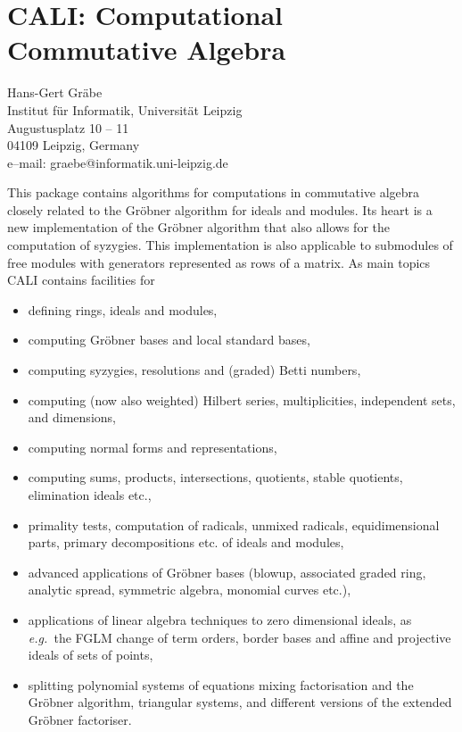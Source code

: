\documentclass[11pt,letterpaper]{book}
\makeatletter
\newcommand{\underscore}{\_}
\newcommand{\ttindex}[1]{{\renewcommand{\_}{\protect\underscore}%
                          \index{#1@{\tt #1}}}}
\makeatother
\begin{document}
\chapter[CALI: Commutative Algebra]{CALI: Computational Commutative Algebra}
\label{CALI}

{\footnotesize
\begin{center}
Hans-Gert Gr\"abe \\
Institut f\"ur Informatik, Universit\"at Leipzig\\
Augustusplatz 10 -- 11\\
04109 Leipzig, Germany \\[0.05in]
e--mail: graebe@informatik.uni-leipzig.de
\end{center}
}

\ttindex{CALI}

This package contains algorithms for computations in commutative algebra
closely related to the Gr\"obner algorithm for ideals and modules.  Its
heart is a new implementation of the Gr\"obner algorithm that also allows
for the computation of syzygies.  This implementation is also applicable to
submodules of free modules with generators represented as rows of a matrix.
As main topics CALI contains facilities for
\begin{itemize}
\item defining rings, ideals and modules,

\item computing Gr\"obner bases and local standard bases,

\item computing syzygies, resolutions and (graded) Betti numbers,

\item computing (now also weighted) Hilbert series, multiplicities,
independent sets, and dimensions,

\item computing normal forms and representations,

\item computing sums, products, intersections, quotients, stable
quotients, elimination ideals etc.,

\item primality tests, computation of radicals, unmixed radicals,
equidimensional parts, primary decompositions etc. of ideals and
modules,

\item advanced applications of Gr\"obner bases (blowup, associated graded
ring, analytic spread, symmetric algebra, monomial curves etc.),

\item applications of linear algebra techniques to zero dimensional
        ideals, as {\em e.g.\ }the FGLM change of term orders, border bases
        and affine and projective ideals of sets of points,

\item splitting polynomial systems of equations mixing factorisation and
the Gr\"obner algorithm, triangular systems, and different versions of the
extended Gr\"obner factoriser.

\end{itemize}
\end{document}
